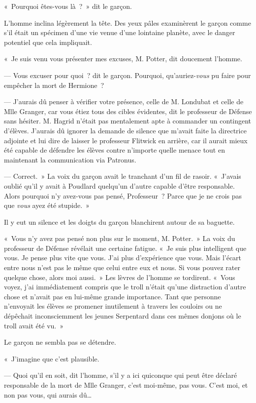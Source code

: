 «~Pourquoi êtes-vous là~?~»
dit le garçon.

L'homme inclina légèrement la tête.
Des yeux pâles examinèrent le garçon comme s'il était un spécimen d'une vie venue d'une lointaine planète, avec le danger potentiel que cela impliquait.

«~Je suis venu vous présenter mes excuses, M. Potter, dit doucement l'homme.

--- Vous excuser pour quoi~? dit le garçon.
Pourquoi, qu'auriez-\emph{vous} pu faire pour empêcher la mort de Hermione~?

--- J'aurais dû penser à vérifier votre présence, celle de M. Londubat et celle de Mlle Granger, car vous étiez tous des cibles évidentes, dit le professeur de Défense sans hésiter.
M. Hagrid n'était pas mentalement apte à commander un contingent d'élèves.
J'aurais dû ignorer la demande de silence que m'avait faite la directrice adjointe et lui dire de laisser le professeur Flitwick en arrière, car il aurait mieux été capable de défendre les élèves contre n'importe quelle menace tout en maintenant la communication via Patronus.

--- Correct.~»
La voix du garçon avait le tranchant d'un fil de rasoir.
«~J'avais oublié qu'il y avait à Poudlard quelqu'un d'autre capable d'être responsable.
Alors pourquoi n'y avez-vous pas pensé, Professeur~?
Parce que je ne crois pas que \emph{vous} ayez été stupide.~»

Il y eut un silence et les doigts du garçon blanchirent autour de sa baguette.

«~Vous n'y avez pas pensé non plus sur le moment, M. Potter.~»
La voix du professeur de Défense révélait une certaine fatigue.
«~Je suis plus intelligent que vous.
Je pense plus vite que vous.
J'ai plus d'expérience que vous.
Mais l'écart entre nous n'est pas le même que celui entre eux et nous.
Si vous pouvez rater quelque chose, alors moi aussi.~»
Les lèvres de l'homme se tordirent.
«~Vous voyez, j'ai immédiatement compris que le troll n'était qu'une distraction d'autre chose et n'avait pas en lui-même grande importance.
Tant que personne n'envoyait les élèves se promener inutilement à travers les couloirs ou ne dépêchait inconsciemment les jeunes Serpentard dans ces mêmes donjons où le troll avait été vu.~»

Le garçon ne sembla pas se détendre.

«~J'imagine que c'est plausible.

--- Quoi qu'il en soit, dit l'homme, s'il y a ici quiconque qui peut être déclaré responsable de la mort de Mlle Granger, c'est moi-même, pas vous.
C'est moi, et non pas vous, qui aurais dû…

